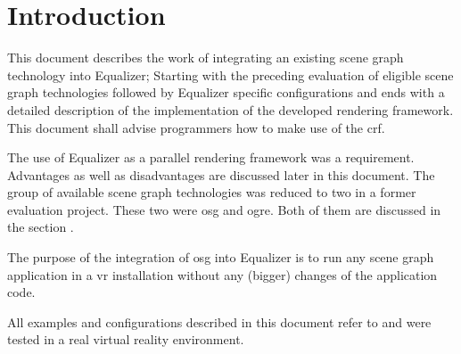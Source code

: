 \chapter{Introduction}

This document describes the work of integrating an existing scene graph technology into Equalizer; Starting with the preceding evaluation of eligible scene graph technologies followed by Equalizer specific configurations and ends with a detailed description of the implementation of the developed rendering framework. This document shall advise programmers how to make use of the \gls{crf}.

The use of Equalizer as a parallel rendering framework was a requirement. Advantages as well as disadvantages are discussed later in this document. The group of available scene graph technologies was reduced to two in a former evaluation project. These two were \gls{osg} and \gls{ogre}. Both of them are discussed in the section .

The purpose of the integration of \gls{osg} into Equalizer is to run any scene graph application in a \gls{vr} installation without any (bigger) changes of the application code. 

All examples and configurations described in this document refer to and were tested in a real virtual reality environment.


